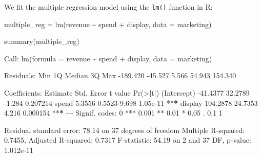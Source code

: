 \documentclass[
  11pt,
]{book}
\makeatletter
\newenvironment{Shaded}{}{}
\newcommand{\AttributeTok}[1]{#1}
\newcommand{\DecValTok}[1]{#1}
\newcommand{\ErrorTok}[1]{\textcolor[rgb]{0.21,0.21,0.21}{\textbf{#1}}}
\newcommand{\FloatTok}[1]{#1}
\newcommand{\FunctionTok}[1]{#1}
\newcommand{\NormalTok}[1]{#1}
\newcommand{\OtherTok}[1]{\textcolor[rgb]{0.39,0.39,0.39}{#1}}
\newcommand{\SpecialCharTok}[1]{\textcolor[rgb]{0.39,0.39,0.39}{#1}}
\newcommand{\StringTok}[1]{\textcolor[rgb]{0.39,0.39,0.39}{#1}}
\newenvironment{kframe}{%
\medskip{}
\setlength{\fboxsep}{.8em}
 \def\at@end@of@kframe{}%
 \ifinner\ifhmode%
  \def\at@end@of@kframe{\end{minipage}}%
  \begin{minipage}{\columnwidth}%
 \fi\fi%
 \def\FrameCommand##1{\hskip\@totalleftmargin \hskip-\fboxsep
 \colorbox{shadecolor}{##1}\hskip-\fboxsep
     \hskip-\linewidth \hskip-\@totalleftmargin \hskip\columnwidth}%
 \MakeFramed {\advance\hsize-\width
   \@totalleftmargin\z@ \linewidth\hsize
   \@setminipage}}%
 {\par\unskip\endMakeFramed%
 \at@end@of@kframe}
\renewenvironment{Shaded}{\begin{kframe}}{\end{kframe}}
\theoremstyle{definition}
\theoremstyle{definition}
\theoremstyle{definition}
\theoremstyle{definition}
\theoremstyle{remark}
\makeatother
\begin{document}
We fit the multiple regression model using the \texttt{lm()} function in R:

\begin{Shaded}
\begin{Highlighting}[]
\NormalTok{multiple\_reg }\OtherTok{=} \FunctionTok{lm}\NormalTok{(revenue }\SpecialCharTok{\textasciitilde{}}\NormalTok{ spend }\SpecialCharTok{+}\NormalTok{ display, }\AttributeTok{data =}\NormalTok{ marketing)}

\FunctionTok{summary}\NormalTok{(multiple\_reg)}
   
\NormalTok{   Call}\SpecialCharTok{:}
   \FunctionTok{lm}\NormalTok{(}\AttributeTok{formula =}\NormalTok{ revenue }\SpecialCharTok{\textasciitilde{}}\NormalTok{ spend }\SpecialCharTok{+}\NormalTok{ display, }\AttributeTok{data =}\NormalTok{ marketing)}
   
\NormalTok{   Residuals}\SpecialCharTok{:}
\NormalTok{        Min       }\DecValTok{1}\NormalTok{Q   Median       }\DecValTok{3}\NormalTok{Q      Max }
   \SpecialCharTok{{-}}\FloatTok{189.420}  \SpecialCharTok{{-}}\FloatTok{45.527}    \FloatTok{5.566}   \FloatTok{54.943}  \FloatTok{154.340} 
   
\NormalTok{   Coefficients}\SpecialCharTok{:}
\NormalTok{               Estimate Std. Error t value }\FunctionTok{Pr}\NormalTok{(}\SpecialCharTok{\textgreater{}}\ErrorTok{|}\NormalTok{t}\SpecialCharTok{|}\NormalTok{)    }
\NormalTok{   (Intercept) }\SpecialCharTok{{-}}\FloatTok{41.4377}    \FloatTok{32.2789}  \SpecialCharTok{{-}}\FloatTok{1.284} \FloatTok{0.207214}    
\NormalTok{   spend         }\FloatTok{5.3556}     \FloatTok{0.5523}   \FloatTok{9.698} \FloatTok{1.05e{-}11} \SpecialCharTok{**}\ErrorTok{*}
\NormalTok{   display     }\FloatTok{104.2878}    \FloatTok{24.7353}   \FloatTok{4.216} \FloatTok{0.000154} \SpecialCharTok{**}\ErrorTok{*}
   \SpecialCharTok{{-}{-}{-}}
\NormalTok{   Signif. codes}\SpecialCharTok{:}  \DecValTok{0} \StringTok{\textquotesingle{}***\textquotesingle{}} \FloatTok{0.001} \StringTok{\textquotesingle{}**\textquotesingle{}} \FloatTok{0.01} \StringTok{\textquotesingle{}*\textquotesingle{}} \FloatTok{0.05} \StringTok{\textquotesingle{}.\textquotesingle{}} \FloatTok{0.1} \StringTok{\textquotesingle{} \textquotesingle{}} \DecValTok{1}
   
\NormalTok{   Residual standard error}\SpecialCharTok{:} \FloatTok{78.14}\NormalTok{ on }\DecValTok{37}\NormalTok{ degrees of freedom}
\NormalTok{   Multiple R}\SpecialCharTok{{-}}\NormalTok{squared}\SpecialCharTok{:}  \FloatTok{0.7455}\NormalTok{, Adjusted R}\SpecialCharTok{{-}}\NormalTok{squared}\SpecialCharTok{:}  \FloatTok{0.7317} 
\NormalTok{   F}\SpecialCharTok{{-}}\NormalTok{statistic}\SpecialCharTok{:} \FloatTok{54.19}\NormalTok{ on }\DecValTok{2}\NormalTok{ and }\DecValTok{37}\NormalTok{ DF,  p}\SpecialCharTok{{-}}\NormalTok{value}\SpecialCharTok{:} \FloatTok{1.012e{-}11}
\end{Highlighting}
\end{Shaded}
\end{document}
